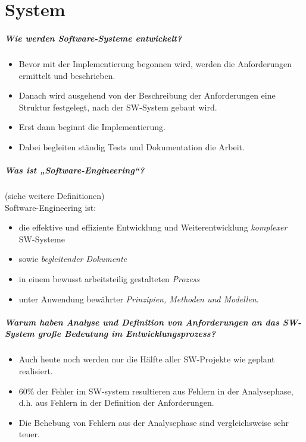 \documentclass{scrreprt}
\begin{document}

\chapter{System}

\paragraph{Wie werden Software-Systeme entwickelt?}
\begin{itemize}
\item Bevor mit der Implementierung begonnen wird, werden die Anforderungen ermittelt und beschrieben.
\item Danach wird ausgehend von der Beschreibung der Anforderungen eine Struktur festgelegt, nach der SW-System gebaut wird.
\item Erst dann beginnt die Implementierung.
\item Dabei begleiten ständig Tests und Dokumentation die Arbeit.
\end{itemize}
\paragraph{Was ist „Software-Engineering“?} (siehe weitere Definitionen)\\
Software-Engineering ist:
\begin{itemize}
\item die effektive und effiziente Entwicklung und Weiterentwicklung \emph{komplexer} SW-Systeme
\item sowie \emph{begleitender Dokumente}
\item in einem bewusst arbeitsteilig gestalteten \emph{Prozess}
\item unter Anwendung bewährter \emph{Prinzipien, Methoden und Modellen}.
\end{itemize}
\paragraph{Warum haben Analyse und Definition von Anforderungen an das SW-System große Bedeutung
im Entwicklungsprozess?}
\begin{itemize}
\item Auch heute noch werden nur die Hälfte aller SW-Projekte wie geplant realisiert.
\item 60\% der Fehler im SW-system resultieren aus Fehlern in der Analysephase, d.h. aus Fehlern in der Definition der Anforderungen.
\item Die Behebung von Fehlern aus der Analysephase sind vergleichsweise sehr teuer.
\end{itemize}
\end{document}
